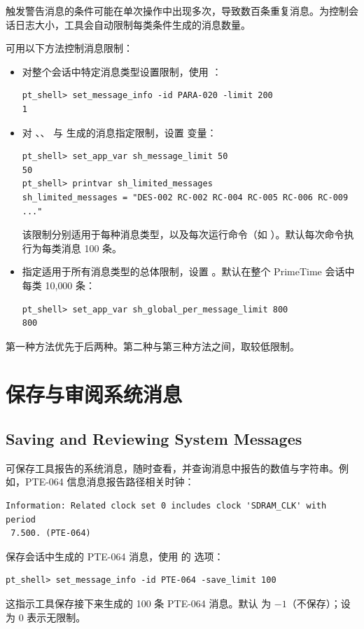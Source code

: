 触发警告消息的条件可能在单次操作中出现多次，导致数百条重复消息。为控制会话日志大小，工具会自动限制每类条件生成的消息数量。

可用以下方法控制消息限制：
\begin{itemize}
  \item 对整个会话中特定消息类型设置限制，使用 ：
\begin{lstlisting}
pt_shell> set_message_info -id PARA-020 -limit 200
1
\end{lstlisting}
  \item 对 、、 与  生成的消息指定限制，设置  变量：
\begin{lstlisting}
pt_shell> set_app_var sh_message_limit 50
50
pt_shell> printvar sh_limited_messages
sh_limited_messages = "DES-002 RC-002 RC-004 RC-005 RC-006 RC-009 ..."
\end{lstlisting}
        该限制分别适用于每种消息类型，以及每次运行命令（如 ）。默认每次命令执行为每类消息 100 条。
  \item 指定适用于所有消息类型的总体限制，设置 。默认在整个 PrimeTime 会话中每类 10{,}000 条：
\begin{lstlisting}
pt_shell> set_app_var sh_global_per_message_limit 800
800
\end{lstlisting}
\end{itemize}

第一种方法优先于后两种。第二种与第三种方法之间，取较低限制。

\section{保存与审阅系统消息}
\subsection*{Saving and Reviewing System Messages}

可保存工具报告的系统消息，随时查看，并查询消息中报告的数值与字符串。例如，PTE-064 信息消息报告路径相关时钟：
\begin{lstlisting}
Information: Related clock set 0 includes clock 'SDRAM_CLK' with period
 7.500. (PTE-064)
\end{lstlisting}

保存会话中生成的 PTE-064 消息，使用  的  选项：
\begin{lstlisting}
pt_shell> set_message_info -id PTE-064 -save_limit 100
\end{lstlisting}
这指示工具保存接下来生成的 100 条 PTE-064 消息。默认  为 $-1$（不保存）；设为 0 表示无限制。

